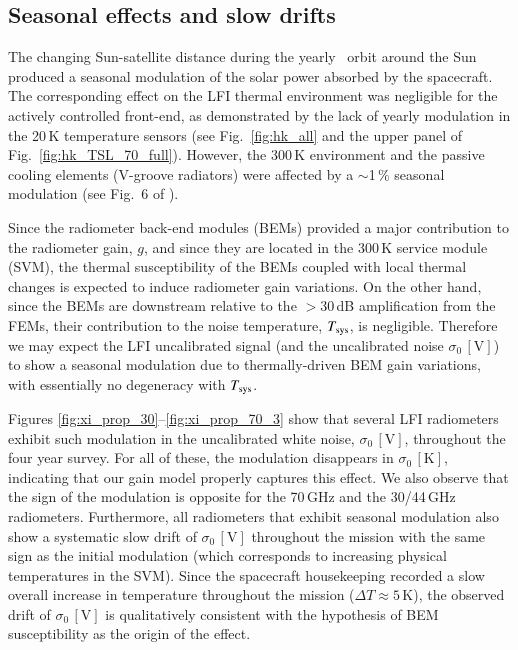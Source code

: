 \documentclass{aa}
\begin{document}
\subsection{Seasonal effects and slow drifts}
\label{sec:seasonal}
The changing Sun-satellite distance during the yearly \Planck\ orbit
around the Sun produced a seasonal modulation of the solar power
absorbed by the spacecraft. The corresponding effect on the LFI
thermal environment was negligible for the
actively controlled front-end, as demonstrated by the lack of yearly
modulation in the 20\,K temperature sensors (see Fig.~\ref{fig:hk_all} and
the upper panel of Fig.~\ref{fig:hk_TSL_70_full}). However, the 300\,K
environment and the passive cooling elements (V-groove radiators) were
affected by a $\sim$1\,\% seasonal modulation (see Fig.~6 of
\citealp{planck2013-p01}).

Since the radiometer back-end modules (BEMs) provided a major
contribution to the radiometer gain, $g$, and since they are located in the
300\,K service module (SVM), the thermal susceptibility of the BEMs
coupled with local thermal changes is expected to induce radiometer
gain variations. On the other hand, since the BEMs are downstream
relative to the $>$30\,dB amplification from the FEMs, their
contribution to the noise temperature, $T_{\rm sys}$, is
negligible. Therefore we may expect the LFI uncalibrated signal (and
the uncalibrated noise $\sigma_0 \,\mathrm{[V]}$) to show a seasonal
modulation due to thermally-driven BEM gain variations, with
essentially no degeneracy with $T_{\rm sys}$.

Figures \ref{fig:xi_prop_30}--\ref{fig:xi_prop_70_3} show that
several LFI radiometers exhibit such modulation in the uncalibrated
white noise, $\sigma_0 \,\mathrm{[V]}$, throughout the four year survey. For all of
these, the modulation disappears in $\sigma_0 \,\mathrm{[K]}$, indicating that
our gain model properly captures this effect. We also observe that the
sign of the modulation is opposite for the 70\,GHz and the 30/44\,GHz
radiometers. Furthermore, all radiometers that exhibit seasonal
modulation also show a systematic slow drift of $\sigma_0 \,\mathrm{[V]}$
throughout the mission with the same sign as the initial modulation
(which corresponds to increasing physical temperatures in the
SVM). Since the spacecraft housekeeping recorded a slow overall
increase in temperature throughout the mission ($\Delta T \approx
5$\,K), the observed drift of $\sigma_0 \,\mathrm{[V]}$ is qualitatively consistent
with the hypothesis of BEM susceptibility as the origin of the effect.
\end{document}
